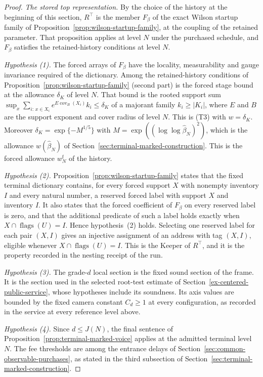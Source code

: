 \begin{proof}
\emph{The stored top representation.} By the choice of the history at
the beginning of this section, $R^\top$ is the member $F_\beta$ of the
exact Wilson startup family of
Proposition~\ref{prop:wilson-startup-family}, at the coupling of the
retained parameter. That proposition applies at level $N$ under the
purchased schedule, and $F_\beta$ satisfies the retained-history
conditions at level $N$.

\emph{Hypothesis (1).} The forced arrays of $F_\beta$ have the locality,
measurability and gauge invariance required of the dictionary. Among the
retained-history conditions of Proposition~\ref{prop:wilson-startup-family}
(second part) is the forced stage bound at the allowance $\delta_K$ of
level $N$. That bound is the rooted support sum
$\sup_x\sum_{i:\,x\in X_i}e^{E\operatorname{cov}_B(X_i)}k_i\le\delta_K$
of a majorant family $k_i\ge|K_i|$, where $E$ and $B$ are the support
exponent and cover radius of level $N$. This is (T3) with $w=\delta_K$.
Moreover $\delta_K=\exp\{-M^{1/5}\}$ with
$M=\exp((\log\log\widehat\beta_N)^2)$, which is the allowance
$w(\widehat\beta_N)$ of Section~\ref{sec:terminal-marked-construction}.
This is the forced allowance $w^{\mathrm f}_N$ of the history.

\emph{Hypothesis (2).} Proposition~\ref{prop:wilson-startup-family}
states that the fixed terminal dictionary contains, for every forced
support $X$ with nonempty inventory $I$ and every natural number, a
reserved forced label with support $X$ and inventory $I$. It also states
that the forced coefficient of $F_\beta$ on every reserved label is
zero, and that the additional predicate of such a label holds exactly
when $X\cap\operatorname{flags}(U)=I$. Hence hypothesis~(2) holds. Selecting one reserved label for each pair $(X,I)$ gives an
injective assignment of an address with tag $(X,I)$, eligible whenever
$X\cap\operatorname{flags}(U)=I$. This is the Keeper of $R^\top$, and it
is the property recorded in the nesting receipt of the run.

\emph{Hypothesis (3).} The grade-$d$ local section is the fixed sound
section of the frame. It is the section used in the selected root-test
estimate of Section~\ref{ex-centered-public-service}, whose hypotheses
include its soundness. Its axis values are bounded by the fixed camera
constant $C_d\ge1$ at every configuration, as recorded in the service at
every reference level above.

\emph{Hypothesis (4).} Since $d\le J(N)$, the final sentence of
Proposition~\ref{prop:terminal-marked-voice} applies at the admitted
terminal level $N$. The fee thresholds are among the entrance delays of
Section~\ref{sec:common-observable-purchases}, as stated in the third
subsection of Section~\ref{sec:terminal-marked-construction}.


\end{proof}
